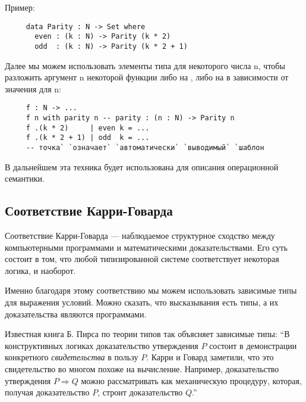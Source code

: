      Пример:
     \begin{lstlisting}
     data Parity : N -> Set where
       even : (k : N) -> Parity (k * 2)
       odd  : (k : N) -> Parity (k * 2 + 1)
     \end{lstlisting}

     Далее мы можем использовать элементы типа  для некоторого числа n, чтобы разложить аргумент n некоторой функции либо на , либо на  в зависимости от значения  для n:
     \begin{lstlisting}
     f : N -> ...
     f n with parity n -- parity : (n : N) -> Parity n
     f .(k * 2)     | even k = ...
     f .(k * 2 + 1) | odd  k = ...
     -- точка` `означает` `автоматически` `выводимый` `шаблон
     \end{lstlisting}

     В дальнейшем эта техника будет использована для описания операционной семантики.
     
  \subsection{Соответствие Карри-Говарда}

     Соответствие Карри-Говарда --- наблюдаемое структурное сходство между компьютерными программами и математическими доказательствами. Его суть состоит в том, что любой типизированной системе соответствует некоторая логика, и наоборот.

     Именно благодаря этому соответствию мы можем использовать зависимые типы для выражения условий. Можно сказать, что высказывания есть типы, а их доказательства являются программами.

     Известная книга Б. Пирса по теории типов так объясняет зависимые типы: ``В конструктивных логиках доказательство утверждения $P$ состоит в демонстрации конкретного \emph{свидетельства} в пользу $P$. Карри и Говард заметили, что это свидетельство во многом похоже на вычисление. Например, доказательство утверждения $P \Rightarrow Q$ можно рассматривать как механическую процедуру, которая, получая доказательство $P$, строит доказательство $Q$.''\cite{Pierce:2002:TPL:509043}


